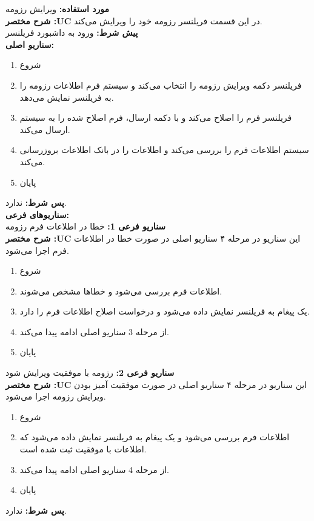 \textbf{مورد استفاده:}
ویرایش رزومه
\\
\textbf{شرح مختصر :UC}
در این قسمت فریلنسر رزومه خود را ویرایش می‌کند.
\\
\textbf{پيش شرط:}
ورود به داشبورد فریلنسر
\\
\textbf{سناريو اصلی:}
\begin{enumerate}
\item
شروع
\item
فریلنسر دکمه ویرایش رزومه را انتخاب می‌کند و سیستم فرم اطلاعات رزومه را به فریلنسر نمایش می‌دهد.
\item
فریلنسر فرم را اصلاح می‌کند و با دکمه ارسال، فرم اصلاح شده را به سیستم ارسال می‌کند.
\item
سیستم اطلاعات فرم را بررسی می‌کند و اطلاعات را در بانک اطلاعات بروزرسانی می‌کند.
\item
پایان
\end{enumerate}

\noindent
\textbf{پس شرط:}
ندارد.
\\
\textbf{سناريوهای فرعی:}
\\
\textbf{سناريو فرعی 1:}
خطا در اطلاعات فرم رزومه
\\
\textbf{شرح مختصر :UC}
این سناریو در مرحله ۴ سناریو اصلی در صورت خطا در اطلاعات فرم اجرا می‌شود.
\begin{enumerate}
\item
شروع
\item
اطلاعات فرم بررسی می‌شود و خطاها مشخص می‌شوند.
\item
یک پیغام به فریلنسر نمایش داده می‌شود و درخواست اصلاح اطلاعات فرم را دارد.
\item
از مرحله 3 سناریو اصلی ادامه پیدا می‌کند.
\item
پایان
\end{enumerate}

\noindent
\textbf{سناريو فرعی 2:}
رزومه با موفقیت ویرایش شود
\\
\textbf{شرح مختصر :UC}
این سناریو در مرحله ۴ سناریو اصلی در صورت موفقیت آمیز بودن ویرایش رزومه اجرا می‌شود.
\begin{enumerate}
\item
شروع
\item
اطلاعات فرم بررسی می‌شود و یک پیغام به فریلنسر نمایش داده می‌شود که اطلاعات با موفقیت ثبت شده است.
\item
از مرحله 4 سناریو اصلی ادامه پیدا می‌کند.
\item
پایان
\end{enumerate}

\noindent
\textbf{پس شرط:}
ندارد.



